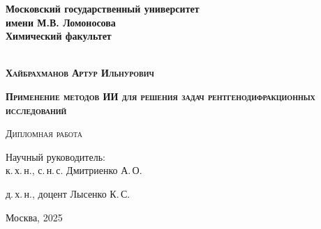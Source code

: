 \begin{titlepage}
\newpage

\begin{center}

\textbf{Московский государственный университет\\ имени М.В. Ломоносова}\\
\textbf{Химический факультет}\\
\\
\end{center}
\vspace{1cm}


\vspace{8em}
\begin{center}
\textsc{\textbf{Хайбрахманов Артур Ильнурович}}
\vspace{1cm}


\textsc{\textbf{\large Применение методов ИИ для решения задач рентгенодифракционных исследований}}


\vspace{1em}

\textsc{Дипломная работа}
\end{center}
\vspace{7em}
\begin{flushright}
Научный руководитель:\\
к.\,х.\,н., с.\,н.\,с. Дмитриенко А.\,О.

д.\,х.\,н., доцент Лысенко К.\,С.

\end{flushright}

\vspace{\fill}

\begin{center}
Москва, 2025
\end{center}

\end{titlepage}
